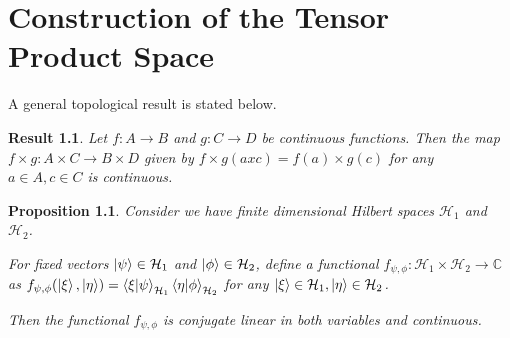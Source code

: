 \documentclass[12pt,twoside,fleqn]{report}
\theoremstyle{thmstyle}
\newtheorem{result}{Result}[chapter]
\newtheorem{prop}{Proposition}[chapter]
\begin{document}
\appendix

\chapter{Construction of the Tensor Product Space}
\label{tensor}

A general topological result is stated below.
\begin{result}
    \label{product:continuous}
    Let $f: A \to B$ and $g: C \to D$ be continuous functions.
    Then the map $f \times g: A \times C \to B \times D$ given by $f \times g (a x c) = f(a) \times g(c)$ for any $a \in A, c \in C$ is continuous.
\end{result}


\begin{prop}
    Consider we have finite dimensional Hilbert spaces $\mathcal{H}_1$ and $\mathcal{H}_2$.

    For fixed vectors $\ket{\psi} \in \mathcal{H}_1$ and $\ket{\phi} \in \mathcal{H}_2$, define a functional $f_{\psi,\phi}: \mathcal{H}_1 \times \mathcal{H}_2 \to \mathbb{C}$ as $f_{\psi,\phi}(\ket\xi, \ket\eta) = \braket{\xi|\psi}_{\mathcal{H}_1} \braket{\eta | \phi}_{\mathcal{H}_2}$ for any $\ket{\xi} \in \mathcal{H}_1, \ket{\eta} \in \mathcal{H}_2$.

    Then the functional $f_{\psi,\phi}$ is conjugate linear in both variables and continuous.
\end{prop}
\end{document}
